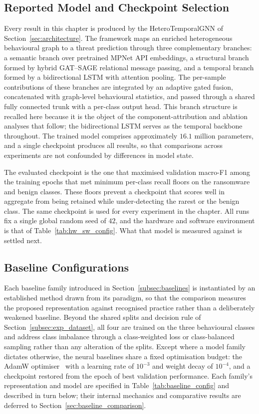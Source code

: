 \documentclass[%
    BCOR=10mm,
    DIV=13,
    toc=bibliography,
    toc=listof,
    oneside,
    12pt,
]{scrbook}
\begin{document}
\subsection{Reported Model and Checkpoint Selection}
\label{subsec:exp_checkpoint}

Every result in this chapter is produced by the HeteroTemporalGNN of
Section~\ref{sec:architecture}. The framework maps an enriched heterogeneous
behavioural graph to a threat prediction through three complementary branches:
a semantic branch over pretrained MPNet API embeddings, a structural branch
formed by hybrid GAT--SAGE relational message passing, and a temporal branch
formed by a bidirectional LSTM with attention pooling. The per-sample
contributions of these branches are integrated by an adaptive gated fusion,
concatenated with graph-level behavioural statistics, and passed through a
shared fully connected trunk with a per-class output head. This branch structure
is recalled here because it is the object of the component-attribution and
ablation analyses that follow; the bidirectional LSTM serves as the temporal
backbone throughout. The trained model comprises approximately $16.1$ million
parameters, and a single checkpoint produces all results, so that comparisons
across experiments are not confounded by differences in model state.

The evaluated checkpoint is the one that maximised validation macro-F1 among the
training epochs that met minimum per-class recall floors on the ransomware and
benign classes. These floors prevent a checkpoint that scores well in aggregate
from being retained while under-detecting the rarest or the benign class. The
same checkpoint is used for every experiment in the chapter. All runs fix a
single global random seed of $42$, and the hardware and software environment is
that of Table~\ref{tab:hw_sw_config}. What that model is measured against is
settled next.

\subsection{Baseline Configurations}
\label{subsec:exp_baseline_config}

Each baseline family introduced in Section~\ref{subsec:baselines} is instantiated
by an established method drawn from its paradigm, so that the comparison measures
the proposed representation against recognised practice rather than a
deliberately weakened baseline. Beyond the shared splits and decision rule of
Section~\ref{subsec:exp_dataset}, all four are trained on the three behavioural
classes and address class imbalance through a class-weighted loss or
class-balanced sampling rather than any alteration of the splits. Except where a
model family dictates otherwise, the neural baselines share a fixed optimisation
budget: the AdamW optimiser~\cite{loshchilov2019adamw} with a learning rate of
$10^{-3}$ and weight decay of $10^{-4}$, and a checkpoint restored from the
epoch of best validation performance. Each family's representation and model are
specified in Table~\ref{tab:baseline_config} and described in turn below; their
internal mechanics and comparative results are deferred to
Section~\ref{sec:baseline_comparison}.
\end{document}
